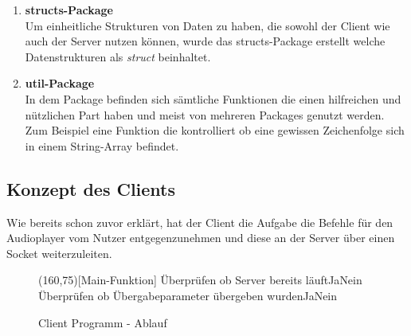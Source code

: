 \begin{enumerate}
\item \textbf{structs-Package} \\
Um einheitliche Strukturen von Daten zu haben, die sowohl der Client wie auch
der Server nutzen können, wurde das structs-Package erstellt welche
Datenstrukturen als \textit{struct} beinhaltet.

\item \textbf{util-Package} \\
In dem Package befinden sich sämtliche Funktionen die einen hilfreichen und
nützlichen Part haben und meist von mehreren Packages genutzt werden. Zum
Beispiel eine Funktion die kontrolliert ob eine gewissen Zeichenfolge sich in
einem String-Array befindet.
\end{enumerate}



\subsection{Konzept des Clients}
Wie bereits schon zuvor erklärt, hat der Client die Aufgabe die Befehle für den
Audioplayer vom Nutzer entgegenzunehmen und diese an der Server über einen
Socket weiterzuleiten.

\begin{figure}[H]
    \begin{struktogramm}(160,75)[Main-Funktion] 
         {Überprüfen ob Server bereits läuft}{Ja}{Nein} 
        	\change
        \ifend
         {Überprüfen ob Übergabeparameter übergeben wurden}{Ja}{Nein} 
            \whileend
            \change
        \ifend
    \end{struktogramm} 
\caption{Client Programm - Ablauf} 
\label{lst:client_ablauf} 
\end{figure}

